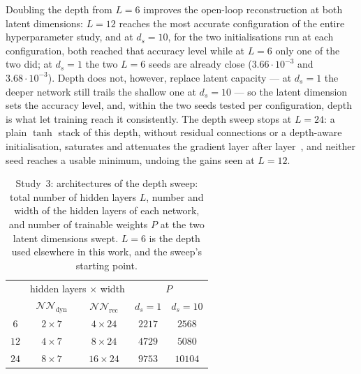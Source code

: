 Doubling the depth from $L=6$ improves the open-loop reconstruction at both latent dimensions:
$L=12$ reaches the most accurate configuration of the entire hyperparameter study, and at
$d_s=10$, for the two initialisations run at each configuration, both reached that accuracy
level while at $L=6$ only one of the two did; at $d_s=1$ the two $L=6$ seeds are already close
($3.66\cdot10^{-3}$ and $3.68\cdot10^{-3}$). Depth does not, however, replace latent capacity — at $d_s=1$ the
deeper network still trails the shallow one at $d_s=10$ — so the latent dimension sets the
accuracy level, and, within the two seeds tested per configuration, depth is what let training
reach it consistently. The depth sweep stops at
$L=24$: a plain $\tanh$ stack of this depth, without residual connections or a depth-aware
initialisation, saturates and attenuates the gradient layer after layer~\cite{glorot2010}, and
neither seed reaches a usable minimum, undoing the gains seen at $L=12$.

\begin{table}[t]
\centering
\begin{tabular}{|c|c|c|c|c|}
\hhline{|-|-|-|-|-|}
\rowcolor{bluePoli!40}
\multicolumn{1}{|c|}{} & \multicolumn{2}{c|}{hidden layers $\times$ width} & \multicolumn{2}{c|}{$P$} \T\B \\
\hhline{|~|-|-|-|-|}
\rowcolor{bluePoli!40}
\multicolumn{1}{|c|}{$L$} & \multicolumn{1}{c|}{$\mathcal{NN}_\mathrm{dyn}$} & \multicolumn{1}{c|}{$\mathcal{NN}_\mathrm{rec}$} & \multicolumn{1}{c|}{$d_s=1$} & \multicolumn{1}{c|}{$d_s=10$} \T\B \\
\hhline{|=|=|=|=|=|}
$6$  & $2\times7$ & $4\times24$  & $2217$ & $2568$  \T\B \\
\hline
$12$ & $4\times7$ & $8\times24$  & $4729$ & $5080$  \T\B \\
\hline
$24$ & $8\times7$ & $16\times24$ & $9753$ & $10104$ \B \\
\hline
\end{tabular}
\\[6pt]
\caption{Study~3: architectures of the depth sweep: total number of hidden layers $L$, number and width
of the hidden layers of each network, and number of trainable weights $P$ at the two latent
dimensions swept. $L=6$ is the depth used elsewhere in this work, and the sweep's starting point.}
\label{tab:depth_arch}
\end{table}

